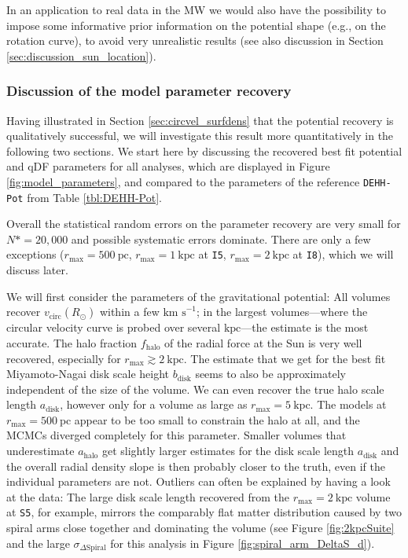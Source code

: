 \documentclass[iop,revtex4,numberedappendix,appendixfloats]{emulateapj}
\newcommand{\hiddenComment}[1]{}
\begin{document}
In an application to real data in the MW we would also have the possibility to impose some informative prior information on the potential shape (e.g., on the rotation curve), to avoid very unrealistic results (see also discussion in Section \ref{sec:discussion_sun_location}).

\hiddenComment{[TO DO: Jo writes: "It would be interesting to figure out a little more how we can determine whether we expect the fit to be strongly biased because we are using a volume that it sitting right on top of a massive spiral arm, although that is perhaps best kept for a later paper."]}

\subsubsection{Discussion of the model parameter recovery} \label{sec:parameter recovery}

Having illustrated in Section \ref{sec:circvel_surfdens} that the potential recovery is qualitatively successful, we will investigate this result more quantitatively in the following two sections. We start here by discussing the recovered best fit potential and qDF parameters for all analyses, which are displayed in Figure \ref{fig:model_parameters}, and compared to the parameters of the reference \texttt{DEHH-Pot} from Table \ref{tbl:DEHH-Pot}. 

Overall the statistical random errors on the parameter recovery are very small for $N*=20,000$ and possible systematic errors dominate. There are only a few exceptions ($r_\text{max}=500~\text{pc}$, $r_\text{max}=1~\text{kpc}$ at \texttt{I5}, $r_\text{max}=2~\text{kpc}$ at \texttt{I8}), which we will discuss later.

We will first consider the parameters of the gravitational potential: All volumes recover $v_\text{circ}(R_\odot)$ within a few $\text{km s}^{-1}$; in the largest volumes---where the circular velocity curve is probed over several $\text{kpc}$---the estimate is the most accurate. The halo fraction $f_\text{halo}$ of the radial force at the Sun is very well recovered, especially for $r_\text{max}\gtrsim 2~\text{kpc}$. The estimate that we get for the best fit Miyamoto-Nagai disk scale height $b_\text{disk}$ seems to also be approximately independent of the size of the volume. We can even recover the true halo scale length $a_\text{disk}$, however only for a volume as large as $r_\text{max}=5~\text{kpc}$. The models at $r_\text{max}=500~\text{pc}$ appear to be too small to constrain the halo at all, and the MCMCs diverged completely for this parameter. Smaller volumes that underestimate $a_\text{halo}$ get slightly larger estimates for the disk scale length $a_\text{disk}$ and the overall radial density slope is then probably closer to the truth, even if the individual parameters are not. Outliers can often be explained by having a look at the data: The large disk scale length recovered from the $r_\text{max}=2~\text{kpc}$ volume at \texttt{S5}, for example, mirrors the comparably flat matter distribution caused by two spiral arms close together and dominating the volume (see Figure \ref{fig:2kpcSuite} and the large $\sigma_{\Delta\text{Spiral}}$ for this analysis in Figure \ref{fig:spiral_arm_DeltaS_d}). 
\end{document}
